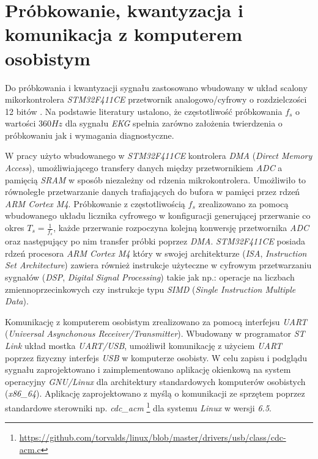 \newpage

\section{Próbkowanie, kwantyzacja i komunikacja z komputerem osobistym}

Do próbkowania i kwantyzacji sygnału zastosowano wbudowany w układ scalony mikorkontrolera \textit{STM32F411CE} przetwornik analogowo/cyfrowy o rozdzielczości 12 bitów \cite{STM32F4DS}.
Na podstawie literatury \cite{Ajdaraga2018} ustalono, że częstotliwość próbkowania $f_{s}$ o wartości $360 Hz$ dla sygnału \textit{EKG} spełnia zarówno założenia twierdzenia o próbkowaniu
jak i wymagania diagnostyczne.


W pracy użyto wbudowanego w \textit{STM32F411CE} kontrolera \textit{DMA} (\textit{Direct Memory Access}), umożliwiającego
transfery danych między przetwornikiem \textit{ADC} a pamięcią \textit{SRAM} w sposób niezależny od rdzenia mikrokontrolera. 
Umożliwiło to równoległe przetwarzanie danych trafiających do bufora w pamięci przez rdzeń \textit{ARM Cortex M4}. 
Próbkowanie z częstotliwością $f_{s}$ zrealizowano za pomocą wbudowanego
układu licznika cyfrowego w konfiguracji generującej przerwanie co okres $T_{s} = \frac{1}{f_s}$, każde przerwanie rozpoczyna kolejną konwersję przetwornika
\textit{ADC} oraz następujący po nim transfer próbki poprzez \textit{DMA}.
\textit{STM32F411CE} posiada rdzeń procesora \textit{ARM Cortex M4} który w swojej architekturze 
(\textit{ISA}, \textit{Instruction Set Architecture}) zawiera również instrukcje użyteczne w cyfrowym przetwarzaniu sygnałów (\textit{DSP}, \textit{Digital Signal Processing}) \cite{CM4DSP} takie jak np.: 
operacje na liczbach zmiennoprzecinkowych czy
instrukcje typu \textit{SIMD} (\textit{Single Instruction Multiple Data}).


Komunikację z komputerem osobistym zrealizowano za pomocą interfejsu \textit{UART} (\textit{Universal Asynchonous Receiver/Transmitter}). 
Wbudowany w programator \textit{ST Link} układ mostka \textit{UART/USB}, umożliwił komunikację z użyciem \textit{UART} poprzez fizyczny interfejs \textit{USB} w komputerze osobisty.
W celu zapisu i podglądu sygnału zaprojektowano i zaimplementowano aplikację okienkową na system operacyjny \textit{GNU/Linux} 
dla architektury standardowych komputerów osobistych (\textit{x86\_64}).
Aplikację zaprojektowano z myślą o komunikacji ze sprzętem poprzez standardowe sterowniki 
np. \textit{cdc\_acm} \footnote{\url{https://github.com/torvalds/linux/blob/master/drivers/usb/class/cdc-acm.c}}
dla systemu \textit{Linux} w wersji \textit{6.5}.

